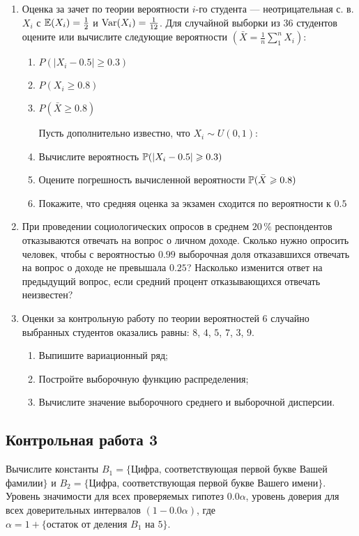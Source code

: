 \begin{enumerate}
\item Оценка за зачет по теории вероятности $i$-го студента — неотрицательная с. в. $X_i$ с $\E(X_i)=\frac{1}{2}$ и $\Var(X_i)=\frac{1}{12}$. Для случайной выборки из $36$ студентов оцените или вычислите следующие вероятности $\left(\bar{X} = \frac{1}{n} \sum \limits_1^n X_i \right)$:
\begin{enumerate}
\item $P(|X_i-0.5|\geqslant 0.3)$
\item $P(X_i\geqslant 0.8)$
\item $P(\bar{X}\geqslant 0.8)$

Пусть дополнительно известно, что $X_i \sim U(0,1)$:
\item Вычислите вероятность $\P(|X_i-0.5|\geqslant 0.3)$
\item Оцените погрешность вычисленной вероятности $\P(\bar{X}\geqslant 0.8)$
\item Покажите, что средняя оценка за экзамен сходится по вероятности к $0.5$

\end{enumerate}

\item При проведении социологических опросов в среднем $20\,\%$ респондентов отказываются отвечать на вопрос о личном доходе. Сколько нужно опросить человек, чтобы с вероятностью $0.99$ выборочная доля отказавшихся отвечать на вопрос о доходе не превышала $0.25$? Насколько изменится ответ на предыдущий вопрос, если средний процент отказывающихся отвечать неизвестен?

\item Оценки за контрольную работу по теории вероятностей $6$ случайно выбранных студентов оказались равны: $8$, $4$, $5$, $7$, $3$, $9$.
\begin{enumerate}
\item Выпишите вариационный ряд;
\item Постройте выборочную функцию распределения;
\item Вычислите значение выборочного среднего и выборочной дисперсии.
\end{enumerate}

\end{enumerate}


\subsection{Контрольная работа 3}

Вычислите константы $B_1=\{\text{Цифра, соответствующая первой букве}$
Вашей\\ фамилии$\}$ и $B_2=\{\text{Цифра, соответствующая первой букве}$
 Вашего имени$\}$.\\
Уровень значимости для всех проверяемых гипотез $0.0\alpha$, уровень доверия для всех доверительных интервалов $(1-0.0\alpha)$, где  $\alpha =1+ \{\text{остаток от деления } B_1 \text{ на }  5\}$.\\

